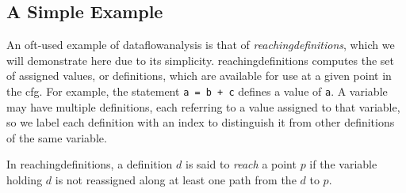 \documentclass[bsc,twoside,singlespacing,parskip,logo,notimes,normalheadings]{infthesis}
\begin{document}
	\subsection{A Simple Example}\label{sec:simpleexample}
	An oft-used example of \gls{dataflowanalysis} is that of {\em
          \gls{reachingdefinition}s}, which we will demonstrate here
        due to its simplicity. \Gls{reachingdefinition}s computes the
        set of assigned values, or definitions, which are available
        for use at a given point in the \gls{cfg}. For example, the
        statement {\tt a = b + c} defines a value of {\tt a}. A
        variable may have multiple definitions, each referring to a
        value assigned to that variable, so we label each definition
        with an index to distinguish it from other definitions of the
        same variable.

        In \gls{reachingdefinition}s, a definition $d$ is said to {\em
          reach} a point $p$ if the variable holding $d$ is not
        reassigned along at least one path from the $d$ to $p$.
\end{document}
